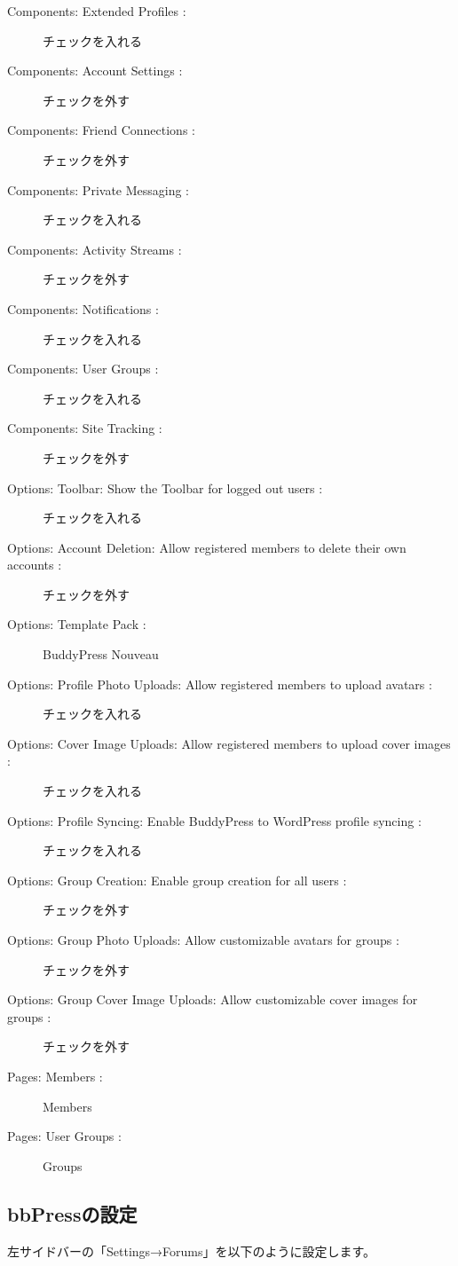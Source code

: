 \documentclass[titlepage,10pt,a4paper,uplatex]{jsbook}
\begin{document}
\begin{description}
\item[Components: Extended Profiles : ] チェックを入れる
\item[Components: Account Settings : ] チェックを外す
\item[Components: Friend Connections : ] チェックを外す
\item[Components: Private Messaging : ] チェックを入れる
\item[Components: Activity Streams : ] チェックを外す
\item[Components: Notifications : ] チェックを入れる
\item[Components: User Groups : ] チェックを入れる
\item[Components: Site Tracking : ] チェックを外す
\item[Options: Toolbar: Show the Toolbar for logged out users : ] チェックを入れる
\item[Options: Account Deletion: Allow registered members to delete their own accounts : ] チェックを外す
\item[Options: Template Pack : ] BuddyPress Nouveau
\item[Options: Profile Photo Uploads: Allow registered members to upload avatars : ] チェックを入れる
\item[Options: Cover Image Uploads: Allow registered members to upload cover images : ] チェックを入れる
\item[Options: Profile Syncing: Enable BuddyPress to WordPress profile syncing : ] チェックを入れる
\item[Options: Group Creation: Enable group creation for all users : ] チェックを外す
\item[Options: Group Photo Uploads: Allow customizable avatars for groups : ] チェックを外す
\item[Options: Group Cover Image Uploads: Allow customizable cover images for groups : ] チェックを外す
\item[Pages: Members : ] Members
\item[Pages: User Groups : ] Groups
\end{description}

\subsection{bbPressの設定}

左サイドバーの「Settings→Forums」を以下のように設定します。
\end{document}

